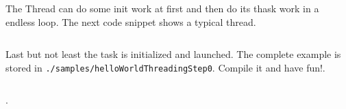 The Thread can do some init work at first and then do its thask work in a endless loop. The next code snippet shows a typical thread. 

\inputminted[firstline=39, lastline=62, linenos, bgcolor=lightgray, fontsize=\scriptsize]{c}{../samples/helloWorldThreadingStep0/src/main.c}

Last but not least the task is initialized and launched. The complete example is stored in \texttt{./samples/helloWorldThreadingStep0}. Compile it and have fun!.

\inputminted[firstline=65, lastline=75, linenos, bgcolor=lightgray, fontsize=\scriptsize]{c}{../samples/helloWorldThreadingStep0/src/main.c}. 
